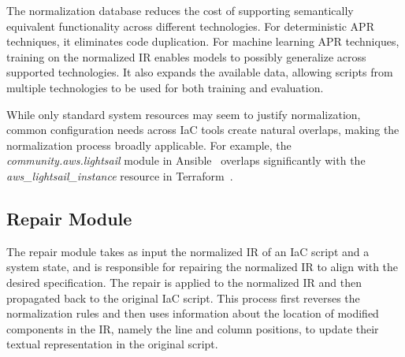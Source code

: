 \documentclass[sigconf,nonacm]{acmart}
\begin{document}
The normalization database reduces the cost of supporting semantically equivalent functionality across different technologies. For deterministic APR techniques, it eliminates code duplication. For machine learning APR techniques, training on the normalized IR enables models to possibly generalize across supported technologies. It also expands the available data, allowing scripts from multiple technologies to be used for both training and evaluation.

While only standard system resources may seem to justify normalization, common configuration needs across IaC tools create natural overlaps, making the normalization process broadly applicable.
For example, the \emph{community.aws.lightsail} module in Ansible~\cite{AnsibleLighsail_2025} overlaps significantly with the \emph{aws\_lightsail\_instance} resource in Terraform~\cite{TerraformLighsail_2025}.

\subsection{Repair Module}
\label{sec:repair}

The repair module takes as input the normalized IR of an IaC script and a system state, and is responsible for repairing the normalized IR to align with the desired specification.
The repair is applied to the normalized IR and then propagated back to the original IaC script. This process first reverses the normalization rules and then uses information about the location of modified components in the IR, namely the line and column positions, to update their textual representation in the original script.
\end{document}

